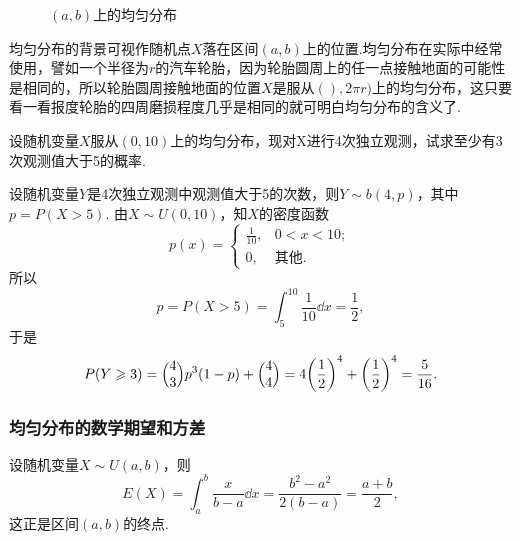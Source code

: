 \begin{figure}[!ht]
  \centering
{}
  \caption{$(a,b)$上的均匀分布}\label{fig:2.5.3}
\end{figure}

均匀分布的背景可视作随机点$X$落在区间$(a,b)$上的位置.均匀分布在实际中经常使用，譬如一个半径为$r$的汽车轮胎，因为轮胎圆周上的任一点接触地面的可能性是相同的，所以轮胎圆周接触地面的位置$X$是服从$(),2\pi r)$上的均匀分布，这只要看一看报度轮胎的四周磨损程度几乎是相同的就可明白均匀分布的含义了.

\begin{example}
  设随机变量$X$服从$(0,10)$上的均匀分布，现对X进行4次独立观测，试求至少有3次观测值大于5的概率.
\end{example}

\begin{solution}
  设随机变量$Y$是4次独立观测中观测值大于5的次数，则$Y\sim b(4,p)$，其中$p=P(X>5)$. 由$X\sim U(0,10)$，知$X$的密度函数
  \[
    p(x) = \begin{cases}
      \frac1{10}, & 0 < x < 10; \\
      0, & \text{其他}.
    \end{cases}
  \]
  所以
  \[
    p = P(X>5) = \int_5^{10} \frac1{10} \dd x = \frac12,
  \]
  于是
  \[
    P(Y\ge3) = \Binom43 p^3(1-p) + \Binom44 = 4\left(\frac12\right)^4 + \left(\frac12\right)^4 = \frac5{16}.
  \]
\end{solution}

\subsubsection{均匀分布的数学期望和方差}
设随机变量$X\sim U(a,b)$，则
\[
  E(X) = \int_a^b \frac x{b-a} \dd x = \frac{b^2-a^2}{2(b-a)} = \frac{a+b}2,
\]
这正是区间$(a,b)$的终点.

